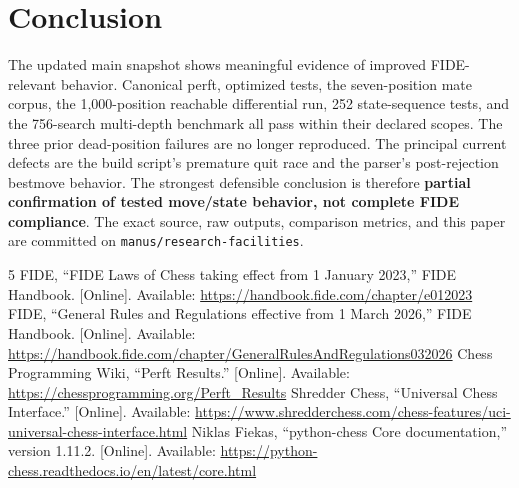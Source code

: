 \documentclass[conference]{IEEEtran}
\begin{document}
\section{Conclusion}
The updated main snapshot shows meaningful evidence of improved FIDE-relevant behavior. Canonical perft, optimized tests, the seven-position mate corpus, the 1,000-position reachable differential run, 252 state-sequence tests, and the 756-search multi-depth benchmark all pass within their declared scopes. The three prior dead-position failures are no longer reproduced. The principal current defects are the build script's premature quit race and the parser's post-rejection bestmove behavior. The strongest defensible conclusion is therefore \textbf{partial confirmation of tested move/state behavior, not complete FIDE compliance}. The exact source, raw outputs, comparison metrics, and this paper are committed on \texttt{manus/research-facilities}.

\begin{thebibliography}{5}
 FIDE, ``FIDE Laws of Chess taking effect from 1 January 2023,'' FIDE Handbook. [Online]. Available: \url{https://handbook.fide.com/chapter/e012023}
 FIDE, ``General Rules and Regulations effective from 1 March 2026,'' FIDE Handbook. [Online]. Available: \url{https://handbook.fide.com/chapter/GeneralRulesAndRegulations032026}
 Chess Programming Wiki, ``Perft Results.'' [Online]. Available: \url{https://chessprogramming.org/Perft_Results}
 Shredder Chess, ``Universal Chess Interface.'' [Online]. Available: \url{https://www.shredderchess.com/chess-features/uci-universal-chess-interface.html}
 Niklas Fiekas, ``python-chess Core documentation,'' version 1.11.2. [Online]. Available: \url{https://python-chess.readthedocs.io/en/latest/core.html}
\end{thebibliography}
\end{document}
